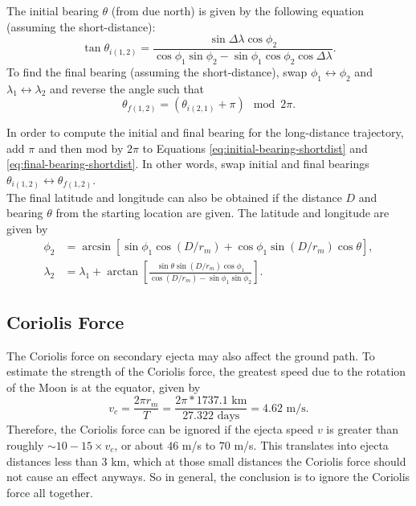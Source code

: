 \documentclass{article}
\begin{document}
The initial bearing $\theta$ %
(from due north) is given by the following equation (assuming the short-distance):
\begin{equation}\label{eq:initial-bearing-shortdist}
\tan\theta_{i(1,2)} = \frac{\sin\Delta\lambda\cos\phi_2}{\cos\phi_1\sin\phi_2-\sin\phi_1\cos\phi_2\cos\Delta\lambda}.
\end{equation}
To find the final bearing (assuming the short-distance), swap $\phi_1\longleftrightarrow\phi_2$ and $\lambda_1\longleftrightarrow\lambda_2$ and reverse the angle such that
\begin{equation}\label{eq:final-bearing-shortdist}
\theta_{f(1,2)} = (\theta_{i(2,1)} + \pi)\mod 2\pi.
\end{equation}

In order to compute the initial and final bearing for the long-distance trajectory, add $\pi$ and then mod by $2\pi$ to Equations \eqref{eq:initial-bearing-shortdist} and \eqref{eq:final-bearing-shortdist}. In other words, swap initial and final bearings $\theta_{i(1,2)}\longleftrightarrow\theta_{f(1,2)}$.\\

The final latitude and longitude can also be obtained if the distance $D$ and bearing $\theta$ from the starting location are given. The latitude and longitude are given by
\begin{align}
\phi_2 &= \arcsin\left[\sin\phi_1\cos(D/r_m) + \cos\phi_1\sin(D/r_m)\cos\theta\right], \\
\lambda_2 &= \lambda_1 + \arctan\left[\frac{\sin\theta\sin(D/r_m)\cos\phi_1}{\cos(D/r_m) - \sin\phi_1\sin\phi_2}\right].
\end{align}


\subsection{Coriolis Force}

The Coriolis force on secondary ejecta may also affect the ground path. To estimate the strength of the Coriolis force, the greatest speed due to the rotation of the Moon is at the equator, given by
\begin{equation}
v_c = \frac{2\pi r_m}{T} = \frac{2\pi * 1737.1 \text{ km}}{27.322 \text{ days}} = 4.62 \text{ m/s}.
\end{equation}
Therefore, the Coriolis force can be ignored if the ejecta speed $v$ is greater than roughly  $\sim10-15\times v_c$, or about $46$ m/s to $70$ m/s. This translates into ejecta distances less than $3$ km, which at those small distances the Coriolis force should not cause an effect anyways. So in general, the conclusion is to ignore the Coriolis force all together.
\end{document}
